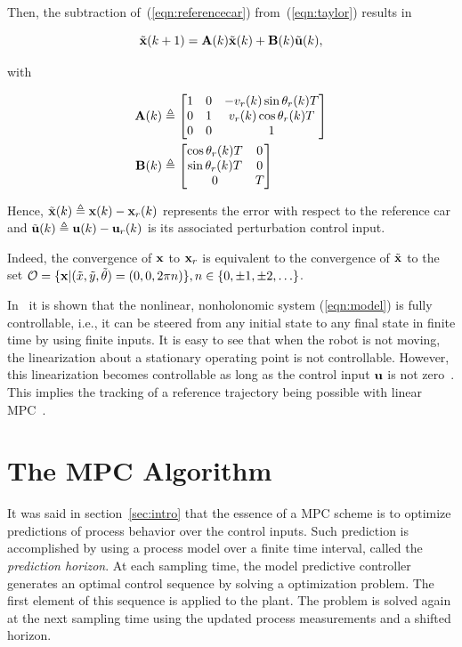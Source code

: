 \documentclass[conference]{IEEEtran} %
\begin{document}
Then, the subtraction of~(\ref{eqn:referencecar}) from~(\ref{eqn:taylor})
results in

\begin{equation}\label{eqn:error}
\tilde{\bf x}(k+1) = {\bf A}(k)\tilde{\bf x}(k)+{\bf B}(k)\tilde{\bf u}(k),
\end{equation}

\noindent with

\begin{align*}
	{\bf A}(k) &\triangleq \begin{bmatrix}
		1 & 0 & -v_r(k)\sin\theta_r(k)T \\
		0 & 1 &  v_r(k)\cos\theta_r(k)T \\
		0 & 0 & 1
	\end{bmatrix} \\
	{\bf B}(k) &\triangleq \begin{bmatrix}
		\cos\theta_r(k)T & 0 \\
		\sin\theta_r(k)T & 0 \\
		0 			  & T
	\end{bmatrix}
\end{align*}

Hence, $\tilde{\bf x}(k) \triangleq {\bf x}(k)-{\bf x}_r(k)$ represents the
error with respect to the reference car and $\tilde{\bf u}(k) \triangleq
{\bf u}(k)-{\bf u}_r(k)$ is its associated perturbation control input.

Indeed, the convergence of ${\bf x}$ to ${\bf x}_r$ is equivalent to the
convergence of $\tilde{\bf x}$ to the set ${\cal O}=\{{\bf x}|(\tilde
x,\tilde y,\tilde\theta)=(0,0,2\pi n)\},n\in \{0,\pm1,\pm2,\ldots\}$.

In~\cite{bloch89} it is shown that the nonlinear, nonholonomic system
(\ref{eqn:model}) is fully controllable, i.e., it can be steered from any
initial state to any final state in finite time by using finite inputs. It
is easy to see that when the robot is not moving, the linearization about a
stationary operating point is not controllable. However, this linearization
becomes controllable as long as the control input ${\bf u}$ is not
zero~\cite{samson91}. This implies the tracking of a reference trajectory
being possible with linear MPC~\cite{essen01}.


\section{The MPC Algorithm}
\label{sec:mpc}

It was said in section~\ref{sec:intro} that the essence of a MPC scheme is
to optimize predictions of process behavior over the control inputs. Such
prediction is accomplished by using a process model over a finite time
interval, called the {\em prediction horizon}. At each sampling time, the
model predictive controller generates an optimal control sequence by solving
a optimization problem. The first element of this sequence is applied to the
plant. The problem is solved again at the next sampling time using the
updated process measurements and a shifted horizon.
\end{document}

